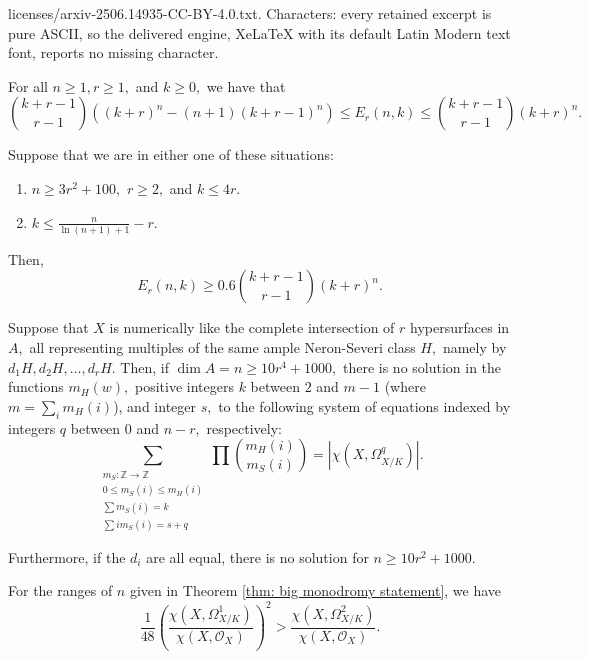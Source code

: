 \documentclass[10pt,a4paper]{amsart}
\begin{document}
licenses/arxiv-2506.14935-CC-BY-4.0.txt. Characters: every retained excerpt is pure ASCII, so the delivered engine, XeLaTeX with its default Latin Modern text font, reports no missing character.
\begin{lemma}\label{lem: Eulerian asymptotic}
For all $n \geq 1, r \geq 1,$ and $k \geq 0,$ we have that $$\binom{k + r - 1}{r-1} \left((k + r)^n - (n+1)(k + r - 1)^n\right) \leq E_r(n, k) \leq \binom{k+r-1}{r-1} (k+r)^n.$$
\end{lemma}

\begin{lemma}\label{lem: more useable asymptotic}
Suppose that we are in either one of these situations:
\begin{enumerate}
    \item $n \geq 3r^2 + 100,$ $r \geq 2,$ and $k \leq 4r.$
    \item $k \leq \frac{n}{\ln(n+1) + 1} - r.$
\end{enumerate} Then, $$E_r(n, k) \geq 0.6 \binom{k+r-1}{r-1}(k+r)^n.$$ 
\end{lemma}

\begin{thm}\label{thm: big monodromy statement}
Suppose that $X$ is numerically like the complete intersection of $r$ hypersurfaces in $A,$ all representing multiples of the same ample Neron-Severi class $H,$ namely by $d_1H, d_2H, \ldots, d_rH.$ Then, if $\dim A = n \geq 10r^4 + 1000,$ there is no solution in the functions $m_H(w),$ positive integers $k$ between $2$ and $m - 1$ (where $m = \sum\limits_i m_H(i)$), and integer $s,$ to the following system of equations indexed by integers $q$ between $0$ and $n-r,$ respectively:
\[\sum\limits_{\substack{m_S: \mathbb{Z} \rightarrow \mathbb{Z} \\ 0 \leq m_S(i) \leq m_H(i) \\ \sum m_S(i) = k \\ \sum im_S(i) = s + q}} \prod\limits \binom{m_H(i)}{m_S(i)} = |\chi(X, \Omega^q_{X/K})|.\]
\par Furthermore, if the $d_i$ are all equal, there is no solution for $n \geq 10r^2 + 1000.$
\end{thm}

\begin{lemma}\label{lem: the core q=2 inequality}
For the ranges of $n$ given in Theorem \ref{thm: big monodromy statement}, we have \[\frac{1}{48} \left(\frac{\chi(X, \Omega^1_{X/K})}{\chi(X, \mathcal{O}_X)}\right)^2 > \frac{\chi(X, \Omega^2_{X/K})}{\chi(X, \mathcal{O}_X)}.\]
\end{lemma}
\end{document}
